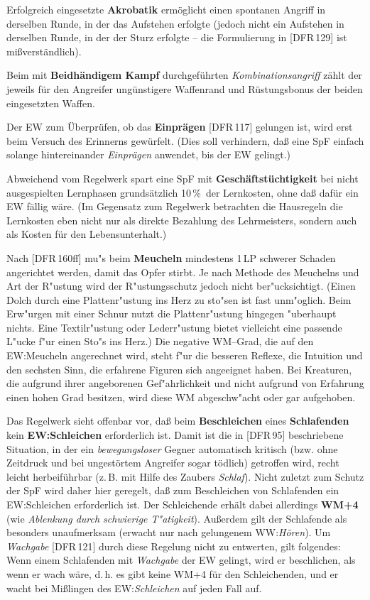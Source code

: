 \documentclass[10pt,a4paper,germanpar]{article}
\begin{document}
Erfolgreich eingesetzte \textbf{Akrobatik} ermöglicht einen spontanen
Angriff in derselben Runde, in der das Aufstehen erfolgte (jedoch
nicht ein Aufstehen in derselben Runde, in der der Sturz erfolgte --
die Formulierung in [DFR\,129] ist mißverständlich).

Beim mit \textbf{Beidhändigem Kampf} durchgeführten
\emph{Kombinationsangriff} zählt der jeweils für den Angreifer
ungünstigere Waffenrand und Rüstungsbonus der beiden eingesetzten
Waffen.

Der EW zum Überprüfen, ob das \textbf{Einprägen} [DFR\,117] gelungen
ist, wird erst beim Versuch des Erinnerns gewürfelt. (Dies soll
verhindern, daß eine SpF einfach solange hintereinander
\emph{Einprägen} anwendet, bis der EW gelingt.)

Abweichend vom Regelwerk spart eine SpF mit
\textbf{Geschäftstüchtigkeit} bei nicht ausgespielten Lernphasen
grundsätzlich 10\,\%\ der Lernkosten, ohne daß dafür ein EW fällig
wäre. (Im Gegensatz zum Regelwerk betrachten die Hausregeln die
Lernkosten eben nicht nur als direkte Bezahlung des Lehrmeisters,
sondern auch als Kosten für den Lebensunterhalt.)

Nach [DFR\,160ff] mu"s beim \textbf{Meucheln} mindestens 1\,LP
schwerer Schaden angerichtet werden, damit das Opfer stirbt. Je nach
Methode des Meuchelns und Art der R"ustung wird der R"ustungsschutz
jedoch nicht ber"ucksichtigt. (Einen Dolch durch eine Plattenr"ustung
ins Herz zu sto"sen ist fast unm"oglich. Beim Erw"urgen mit einer
Schnur nutzt die Plattenr"ustung hingegen "uberhaupt nichts. Eine
Textilr"ustung oder Lederr"ustung bietet vielleicht eine passende
L"ucke f"ur einen Sto"s ins Herz.) Die negative WM--Grad, die auf den
EW:Meucheln angerechnet wird, steht f"ur die besseren Reflexe, die
Intuition und den sechsten Sinn, die erfahrene Figuren sich angeeignet
haben. Bei Kreaturen, die aufgrund ihrer angeborenen Gef"ahrlichkeit
und nicht aufgrund von Erfahrung einen hohen Grad besitzen, wird diese
WM abgeschw"acht oder gar aufgehoben.

Das Regelwerk sieht offenbar vor, daß beim \textbf{Beschleichen} eines
\textbf{Schlafenden} kein \textbf{EW:Schleichen} erforderlich
ist. Damit ist die in [DFR\,95] beschriebene Situation, in der ein
\emph{bewegungsloser} Gegner automatisch kritisch (bzw. ohne Zeitdruck
und bei ungestörtem Angreifer sogar tödlich) getroffen wird, recht
leicht herbeiführbar (z.\,B. mit Hilfe des Zaubers
\emph{Schlaf}). Nicht zuletzt zum Schutz der SpF wird daher hier
geregelt, daß zum Beschleichen von Schlafenden ein EW:Schleichen
erforderlich ist. Der Schleichende erhält dabei allerdings
\textbf{WM+4} (wie \emph{Ablenkung durch schwierige
  T"atigkeit}). Außerdem gilt der Schlafende als besonders
unaufmerksam (erwacht nur nach gelungenem WW:\emph{Hören}). Um
\emph{Wachgabe} [DFR\,121] durch diese Regelung nicht zu entwerten,
gilt folgendes: Wenn einem Schlafenden mit \emph{Wachgabe} der EW
gelingt, wird er beschlichen, als wenn er wach wäre, d.\,h. es gibt
keine WM+4 für den Schleichenden, und er wacht bei Mißlingen des
EW:\emph{Schleichen} auf jeden Fall auf.
\end{document}
